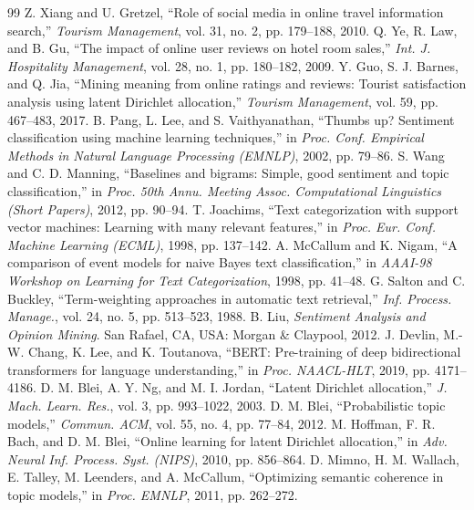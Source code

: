 \documentclass[11pt,journal,draftclsnofoot,onecolumn]{IEEEtran}
\begin{document}
\begin{thebibliography}{99}
 Z. Xiang and U. Gretzel, ``Role of social media in online travel information search,'' \emph{Tourism Management}, vol. 31, no. 2, pp. 179--188, 2010.
 Q. Ye, R. Law, and B. Gu, ``The impact of online user reviews on hotel room sales,'' \emph{Int. J. Hospitality Management}, vol. 28, no. 1, pp. 180--182, 2009.
 Y. Guo, S. J. Barnes, and Q. Jia, ``Mining meaning from online ratings and reviews: Tourist satisfaction analysis using latent Dirichlet allocation,'' \emph{Tourism Management}, vol. 59, pp. 467--483, 2017.
 B. Pang, L. Lee, and S. Vaithyanathan, ``Thumbs up? Sentiment classification using machine learning techniques,'' in \emph{Proc. Conf. Empirical Methods in Natural Language Processing (EMNLP)}, 2002, pp. 79--86.
 S. Wang and C. D. Manning, ``Baselines and bigrams: Simple, good sentiment and topic classification,'' in \emph{Proc. 50th Annu. Meeting Assoc. Computational Linguistics (Short Papers)}, 2012, pp. 90--94.
 T. Joachims, ``Text categorization with support vector machines: Learning with many relevant features,'' in \emph{Proc. Eur. Conf. Machine Learning (ECML)}, 1998, pp. 137--142.
 A. McCallum and K. Nigam, ``A comparison of event models for naive Bayes text classification,'' in \emph{AAAI-98 Workshop on Learning for Text Categorization}, 1998, pp. 41--48.
 G. Salton and C. Buckley, ``Term-weighting approaches in automatic text retrieval,'' \emph{Inf. Process. Manage.}, vol. 24, no. 5, pp. 513--523, 1988.
 B. Liu, \emph{Sentiment Analysis and Opinion Mining}. San Rafael, CA, USA: Morgan \& Claypool, 2012.
 J. Devlin, M.-W. Chang, K. Lee, and K. Toutanova, ``BERT: Pre-training of deep bidirectional transformers for language understanding,'' in \emph{Proc. NAACL-HLT}, 2019, pp. 4171--4186.
 D. M. Blei, A. Y. Ng, and M. I. Jordan, ``Latent Dirichlet allocation,'' \emph{J. Mach. Learn. Res.}, vol. 3, pp. 993--1022, 2003.
 D. M. Blei, ``Probabilistic topic models,'' \emph{Commun. ACM}, vol. 55, no. 4, pp. 77--84, 2012.
 M. Hoffman, F. R. Bach, and D. M. Blei, ``Online learning for latent Dirichlet allocation,'' in \emph{Adv. Neural Inf. Process. Syst. (NIPS)}, 2010, pp. 856--864.
 D. Mimno, H. M. Wallach, E. Talley, M. Leenders, and A. McCallum, ``Optimizing semantic coherence in topic models,'' in \emph{Proc. EMNLP}, 2011, pp. 262--272.

\end{thebibliography}
\end{document}
